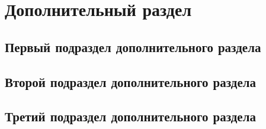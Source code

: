 \chapter{Дополнительный раздел}
\section{Первый подраздел дополнительного раздела}
\section{Второй подраздел дополнительного раздела}
\section{Третий подраздел дополнительного раздела}